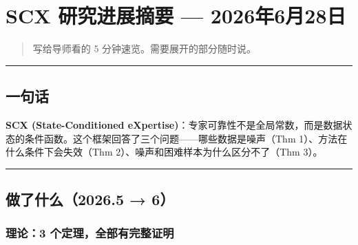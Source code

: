\documentclass[
  12pt,
]{ctexart}
\author{SCX}
\date{2026}
\begin{document}
\section{SCX 研究进展摘要 ---
2026年6月28日}\label{scx-ux7814ux7a76ux8fdbux5c55ux6458ux8981-2026ux5e746ux670828ux65e5}

\begin{quote}
写给导师看的 5 分钟速览。需要展开的部分随时说。
\end{quote}

\begin{center}\rule{0.5\linewidth}{0.5pt}\end{center}

\subsection{一句话}\label{ux4e00ux53e5ux8bdd}

\textbf{SCX (State-Conditioned
eXpertise)}：专家可靠性不是全局常数，而是数据状态的条件函数。这个框架回答了三个问题------哪些数据是噪声（Thm
1）、方法在什么条件下会失效（Thm 2）、噪声和困难样本为什么区分不了（Thm
3）。

\begin{center}\rule{0.5\linewidth}{0.5pt}\end{center}

\subsection{做了什么（2026.5 →
6）}\label{ux505aux4e86ux4ec0ux4e482026.5-6}

\subsubsection{理论：3
个定理，全部有完整证明}\label{ux7406ux8bba3-ux4e2aux5b9aux7406ux5168ux90e8ux6709ux5b8cux6574ux8bc1ux660e}
\end{document}

